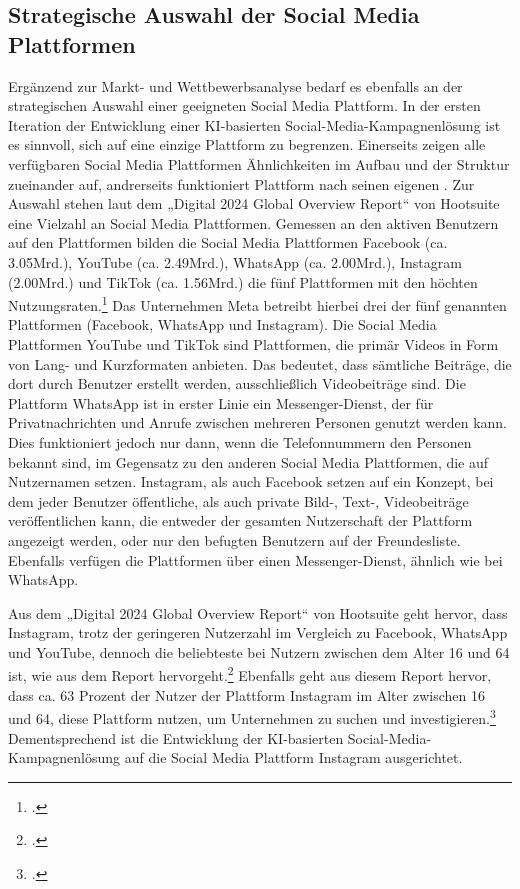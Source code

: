 \subsection{Strategische Auswahl der Social Media Plattformen}
Ergänzend zur Markt- und Wettbewerbsanalyse bedarf es ebenfalls an der strategischen Auswahl einer geeigneten Social Media Plattform.
In der ersten Iteration der Entwicklung einer KI-basierten Social-Media-Kampagnenlösung ist es sinnvoll, sich auf eine einzige Plattform zu begrenzen.
Einerseits zeigen alle verfügbaren Social Media Plattformen Ähnlichkeiten im Aufbau und der Struktur zueinander auf, andrerseits funktioniert Plattform nach seinen eigenen .
Zur Auswahl stehen laut dem „Digital 2024 Global Overview Report“ von Hootsuite eine Vielzahl an Social Media Plattformen.
Gemessen an den aktiven Benutzern auf den Plattformen bilden die Social Media Plattformen Facebook (ca. 3.05Mrd.), YouTube (ca. 2.49Mrd.), WhatsApp (ca. 2.00Mrd.), Instagram (2.00Mrd.) und TikTok (ca. 1.56Mrd.) die fünf Plattformen mit den höchten Nutzungsraten.\footcite{hootsuite_digital_2024_page_232}
Das Unternehmen Meta betreibt hierbei drei der fünf genannten Plattformen (Facebook, WhatsApp und Instagram).
Die Social Media Plattformen YouTube und TikTok sind Plattformen, die primär Videos in Form von Lang- und Kurzformaten anbieten.
Das bedeutet, dass sämtliche Beiträge, die dort durch Benutzer erstellt werden, ausschließlich Videobeiträge sind.
Die Plattform WhatsApp ist in erster Linie ein Messenger-Dienst, der für Privatnachrichten und Anrufe zwischen mehreren Personen genutzt werden kann.
Dies funktioniert jedoch nur dann, wenn die Telefonnummern den Personen bekannt sind, im Gegensatz zu den anderen Social Media Plattformen, die auf Nutzernamen setzen.
Instagram, als auch Facebook setzen auf ein Konzept, bei dem jeder Benutzer öffentliche, als auch private Bild-, Text-, Videobeiträge veröffentlichen kann, die entweder der gesamten Nutzerschaft der Plattform angezeigt werden, oder nur den befugten Benutzern auf der Freundesliste.
Ebenfalls verfügen die Plattformen über einen Messenger-Dienst, ähnlich wie bei WhatsApp.

Aus dem „Digital 2024 Global Overview Report“ von Hootsuite geht hervor, dass Instagram, trotz der geringeren Nutzerzahl im Vergleich zu Facebook, WhatsApp und YouTube, dennoch die beliebteste bei Nutzern zwischen dem Alter 16 und 64 ist, wie aus dem Report hervorgeht.\footcite{hootsuite_digital_2024_page_236}
Ebenfalls geht aus diesem Report hervor, dass ca. 63 Prozent der Nutzer der Plattform Instagram im Alter zwischen 16 und 64, diese Plattform nutzen, um Unternehmen zu suchen und investigieren.\footcite{hootsuite_digital_2024_page_250}
Dementsprechend ist die Entwicklung der KI-basierten Social-Media-Kampagnenlösung auf die Social Media Plattform Instagram ausgerichtet.

